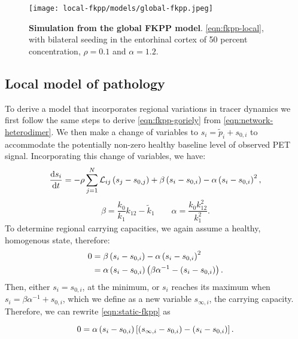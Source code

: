 \begin{figure}[H]
    \centering
    \texttt{[image: local-fkpp/models/global-fkpp.jpeg]}
    \caption{\textbf{Simulation from the global FKPP model}. \cref{eqn:fkpp-local}, 
    with bilateral seeding in the entorhinal cortex of 50 percent concentration, 
    $\rho = 0.1$ and $\alpha = 1.2$.}
    \label{fig:fkpp-global}
\end{figure}

\subsection{Local model of \TP pathology}
To derive a model that incorporates regional variations in tracer dynamics we
first follow the same steps to derive \cref{eqn:fkpp-goriely} from
\cref{eqn:network-heterodimer}.  We then make a change of variables to $s_i =
\tilde{p}_i + s_{0,i}$  to accommodate the potentially non-zero healthy baseline
level of observed \TP PET signal. Incorporating this change of variables, we
have: 
\begin{equation}\label{eqn:fkpp-suvr}
    \dfrac{\mathrm{d}s_i}{\mathrm{d}t} = - \rho \sum\limits_{j=1}^{N}\mathcal{L}_{ij} \left(s_{j} - s_{0,j}\right)  
                        + \beta \left(s_{i} - s_{0,i}\right) 
                         -\alpha \left(s_{i} - s_{0,i}\right)^2,
\end{equation}
\[
    \beta = \frac{k_0}{k_1}k_{12} - \tilde{k}_{1} 
    \qquad
    \alpha = \frac{k_0 k_{12}^2}{k_1^2}.
\]
To determine regional carrying capacities, we again assume a healthy, homogenous
state, therefore: 
\begin{align}
    0 &= \beta \left(s_{i} - s_{0,i}\right) - \alpha \left(s_{i} - s_{0,i}\right)^2 \\
      &=\alpha\left(s_{i} - s_{0,i}\right)\left(\beta \alpha^{-1} - \left(s_{i} - s_{0,i}\right)\right).
    \label{eqn:static-fkpp}
\end{align}
Then, either $s_i = s_{0,i}$, at the minimum, or $s_i$ reaches 
its maximum when $s_i = \beta\alpha^{-1} + s_{0,i}$, which we define as
a new variable $s_{\infty,i}$, the carrying capacity. Therefore, we can rewrite
\cref{eqn:static-fkpp} as

\begin{equation}
    0 = \alpha \left(s_{i} - s_{0,i}\right)\left[ \left(s_{\infty, i} - s_{0,i}\right) - \left(s_{i} - s_{0,i}\right) \right].    
    \label{eqn:homogenous-local-fkpp}
\end{equation}

